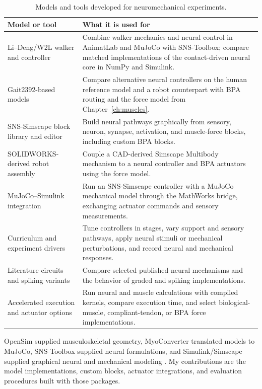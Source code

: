 \begin{table}[htbp]
\centering
\caption[Models and tools developed for neuromechanical experiments]{Models and tools developed for neuromechanical experiments.}
\label{tab:sns_capability}
\small
\begin{tabularx}{\textwidth}{@{}>{\raggedright\arraybackslash}p{}>{\raggedright\arraybackslash}X@{}}
\toprule
\textbf{Model or tool} & \textbf{What it is used for} \\
\midrule
Li--Deng/W2L walker and controller & Combine walker mechanics and neural control in AnimatLab and MuJoCo with SNS-Toolbox; compare matched implementations of the contact-driven neural core in NumPy and Simulink. \\
Gait2392-based models & Compare alternative neural controllers on the human reference model and a robot counterpart with BPA routing and the force model from Chapter~\ref{ch:muscles}. \\
SNS-Simscape block library and editor & Build neural pathways graphically from sensory, neuron, synapse, activation, and muscle-force blocks, including custom BPA blocks. \\
SOLIDWORKS-derived robot assembly & Couple a CAD-derived Simscape Multibody mechanism to a neural controller and BPA actuators using the force model. \\
MuJoCo--Simulink integration & Run an SNS-Simscape controller with a MuJoCo mechanical model through the MathWorks bridge, exchanging actuator commands and sensory measurements. \\
Curriculum and experiment drivers & Tune controllers in stages, vary support and sensory pathways, apply neural stimuli or mechanical perturbations, and record neural and mechanical responses. \\
Literature circuits and spiking variants & Compare selected published neural mechanisms and the behavior of graded and spiking implementations. \\
Accelerated execution and actuator options & Run neural and muscle calculations with compiled kernels, compare execution time, and select biological-muscle, compliant-tendon, or BPA force implementations. \\
\bottomrule
\end{tabularx}
\end{table}

OpenSim supplied musculoskeletal geometry, MyoConverter translated models to MuJoCo, SNS-Toolbox supplied neural formulations, and Simulink/Simscape supplied graphical neural and mechanical modeling \citep{delp_opensim_2007, caggiano_myosuite_2022, todorov_mujoco_2012,nourse_sns_2023}. My contributions are the model implementations, custom blocks, actuator integrations, and evaluation procedures built with those packages.

